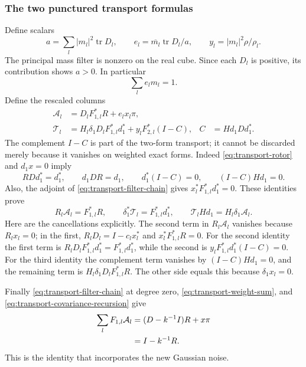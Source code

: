 \subsubsection{The two punctured transport formulas}
Define scalars
\[
 a=\sum_l |m_l|^2\operatorname{tr}D_l,\qquad
 e_l=\overline{m_l}\operatorname{tr}D_l/a,
 \qquad y_l=|m_l|^2\rho/\rho_l.
\]
The principal mass filter is nonzero on the real cube. Since each
$D_l$ is positive, its contribution shows $a>0$. In particular
\begin{equation}\label{eq:transport-weight-sum}
                              \sum_l e_lm_l=1.
\end{equation}
Define the rescaled columns
\begin{align}
 \mathcal A_l&=D_lF_{1,l}^*R+e_lx_l\pi,
                                      \label{eq:transport-A}\\
 \mathcal T_l&=H_l\delta_1D_lF_{1,l}^*d_1^*
                    +y_lF_{2,l}^*(I-C),
 & C&=Hd_1Dd_1^*.                    \label{eq:transport-T}
\end{align}
The complement $I-C$ is part of the two-form transport; it cannot
be discarded merely because it vanishes on weighted exact forms.
Indeed \eqref{eq:transport-rotor} and $d_1x=0$ imply
\[
 RDd_1^*=d_1^*,\qquad d_1DR=d_1,
 \qquad d_1^*(I-C)=0,\qquad (I-C)Hd_1=0.
\]
Also, the adjoint of \eqref{eq:transport-filter-chain} gives
$x_l^*F_{1,l}^*d_1^*=0$. These identities prove
\begin{equation}\label{eq:transport-punctured-three}
 R_l\mathcal A_l=F_{1,l}^*R,\qquad
 \delta_1^*\mathcal T_l=F_{1,l}^*d_1^*,\qquad
 \mathcal T_lHd_1=H_l\delta_1\mathcal A_l.
\end{equation}
Here are the cancellations explicitly. The second term in
$R_l\mathcal A_l$ vanishes because $R_lx_l=0$; in the first,
$R_lD_l=I-c_lx_l^*$ and $x_l^*F_{1,l}^*R=0$.
For the second identity the first term is
$R_lD_lF_{1,l}^*d_1^*=F_{1,l}^*d_1^*$, while the second is
$y_lF_{1,l}^*d_1^*(I-C)=0$.
For the third identity the complement term vanishes by
$(I-C)Hd_1=0$, and the remaining term is
$H_l\delta_1D_lF_{1,l}^*R$. The other side equals this
because $\delta_1x_l=0$.

Finally \eqref{eq:transport-filter-chain} at degree zero,
\eqref{eq:transport-weight-sum}, and
\eqref{eq:transport-covariance-recursion} give
\begin{align}
 \sum_l F_{1,l}\mathcal A_l
  &=(D-k^{-1}I)R+x\pi\notag\\
  &=I-k^{-1}R.                       \label{eq:transport-alias-sum}
\end{align}
This is the identity that incorporates the new Gaussian noise.

